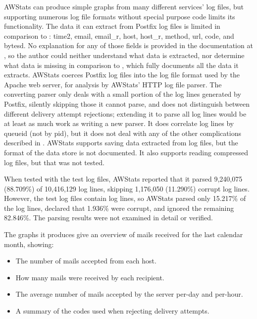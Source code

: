 AWStats can produce simple graphs from many different services' log files,
but supporting numerous log file formats without special purpose code
limits its functionality.  The data it can extract from Postfix log files
is limited in comparison to \parsername{}: time2, email, email\_r, host,
host\_r, method, url, code, and bytesd.  No explanation for any of those
fields is provided in the documentation at
,
so the author could neither understand what data is extracted, nor
determine what data is missing in comparison to \parsername{}, which fully
documents all the data it extracts.  AWStats coerces Postfix log files into
the log file format used by the Apache web server, for analysis by AWStats'
HTTP log file parser.  The converting parser only deals with a small
portion of the log lines generated by Postfix, silently skipping those it
cannot parse, and does not distinguish between different delivery attempt
rejections; extending it to parse all log lines would be at least as much
work as writing a new parser.  It does correlate log lines by queueid (not
by pid), but it does not deal with any of the other complications described
in .  AWStats supports saving data extracted from
log files, but the format of the data store is not documented.  It also
supports reading compressed log files, but that was not tested.

When tested with the \numberOFlogFILES{} test log files, AWStats reported
that it parsed 9,240,075 (88.709\%) of 10,416,129 log lines, skipping
1,176,050 (11.290\%) corrupt log lines.  However, the \numberOFlogFILES{}
test log files contain \numberOFlogLINES{} log lines, so AWStats parsed
only 15.217\% of the log lines, declared that 1.936\% were corrupt, and
ignored the remaining 82.846\%.  The parsing results were not examined in
detail or verified.

The graphs it produces give an overview of mails received for the last
calendar month, showing:

\begin{itemize}

    \squeezeitems{}

    \item The number of mails accepted from each host.

    \item How many mails were received by each recipient.

    \item The average number of mails accepted by the server per-day and
        per-hour.

    \item A summary of the  codes used when rejecting
        delivery attempts.

\end{itemize}

